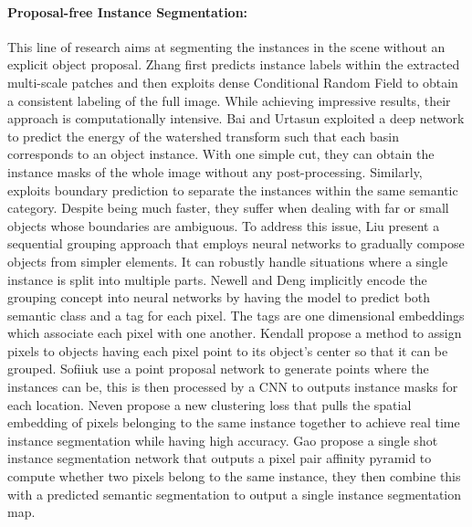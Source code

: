 \documentclass[10pt,twocolumn,letterpaper]{article}
\begin{document}
\paragraph{Proposal-free Instance Segmentation:} This line of research aims at segmenting the instances in the scene without an explicit object proposal. 
Zhang \etal \cite{zhang2015monocular,zhang2016instance} first predicts instance labels within the extracted multi-scale patches and then exploits dense Conditional Random Field \cite{krahenbuhl2011efficient} to obtain a consistent labeling of the full image. While achieving impressive results, their approach is computationally intensive. 
Bai and Urtasun \cite{bai2017deep} exploited a deep network to predict the energy of the watershed transform such that each basin corresponds to an object instance. With one simple cut, they can obtain the instance masks of the whole image without any post-processing. Similarly, \cite{kirillov2017instancecut} exploits boundary prediction to separate the instances within the same semantic category. Despite being much faster, they suffer when dealing with far or small objects whose boundaries are ambiguous.
To address this issue, Liu \etal \cite{liu2017sgn} present a sequential grouping approach that employs neural networks to gradually compose objects from simpler elements. It can robustly handle situations where a single instance is split into multiple parts. Newell and Deng \cite{newell2017associative} implicitly encode the grouping concept into neural networks by having the model to predict both semantic class and a tag for each pixel. The tags are one dimensional embeddings which associate each pixel with one another. Kendall \etal \cite{Kendall_2018_CVPR} propose a method to assign pixels to objects having each pixel point to its object's center so that it can be grouped. Sofiiuk \etal  \cite{Sofiiuk2019AdaptISAI} use a point proposal network to generate points where the instances can be, this is then processed by a CNN to outputs instance masks for each location. Neven \etal \cite{Neven_2019_CVPR} propose a new clustering loss that pulls the spatial embedding of pixels belonging to the same instance together to achieve real time instance segmentation while having high accuracy. Gao \etal \cite{Gao_2019_ICCV} propose a single shot instance segmentation network that outputs a pixel pair affinity pyramid to compute whether two pixels belong to the same instance, they then combine this with a predicted semantic segmentation to output a single instance segmentation map. 
\end{document}
